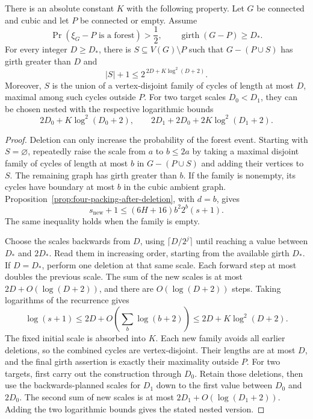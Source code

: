 \begin{theorem}
\label{thm:four-excess-free-girth-raising}
There is an absolute constant $K$ with the following property.
Let $G$ be connected and cubic and let $P$ be connected or empty.
Assume
\[
 \Pr(\xi_G-P\text{ is a forest})>\frac12,
 \qquad \operatorname{girth}(G-P)\ge D_*.
\]
For every integer $D\ge D_*$, there is $S\subseteq V(G)\setminus P$ such that $G-(P\cup S)$ has girth greater than $D$ and
\[
 |S|+1\le 2^{\,2D+K\log^2(D+2)}.
\]
Moreover, $S$ is the union of a vertex-disjoint family of cycles of length at most $D$, maximal among such cycles outside $P$.
For two target scales $D_0<D_1$, they can be chosen nested with the respective logarithmic bounds
\[
 2D_0+K\log^2(D_0+2),\qquad
 2D_1+2D_0+2K\log^2(D_1+2).
\]
\end{theorem}

\begin{proof}
Deletion can only increase the probability of the forest event.
Starting with $S=\varnothing$, repeatedly raise the scale from $a$ to $b\le2a$ by taking a maximal disjoint family of cycles of length at most $b$ in $G-(P\cup S)$ and adding their vertices to $S$.
The remaining graph has girth greater than $b$.
If the family is nonempty, its cycles have boundary at most $b$ in the cubic ambient graph.
Proposition~\ref{prop:four-packing-after-deletion}, with $d=b$, gives
\[
 s_{\mathrm{new}}+1
 \le (6H+16)b^2 2^b(s+1).
\]
The same inequality holds when the family is empty.

Choose the scales backwards from $D$, using $\lceil D/2^j\rceil$ until reaching a value between $D_*$ and $2D_*$.
Read them in increasing order, starting from the available girth $D_*$.
If $D=D_*$, perform one deletion at that same scale.
Each forward step at most doubles the previous scale.
The sum of the new scales is at most $2D+O(\log(D+2))$, and there are $O(\log(D+2))$ steps.
Taking logarithms of the recurrence gives
\[
 \log(s+1)
 \le2D+O\!\left(\sum_b\log(b+2)\right)
 \le2D+K\log^2(D+2).
\]
The fixed initial scale is absorbed into $K$.
Each new family avoids all earlier deletions, so the combined cycles are vertex-disjoint.
Their lengths are at most $D$, and the final girth assertion is exactly their maximality outside $P$.
For two targets, first carry out the construction through $D_0$.
Retain those deletions, then use the backwards-planned scales for $D_1$ down to the first value between $D_0$ and $2D_0$.
The second sum of new scales is at most $2D_1+O(\log(D_1+2))$.
Adding the two logarithmic bounds gives the stated nested version.
\end{proof}

